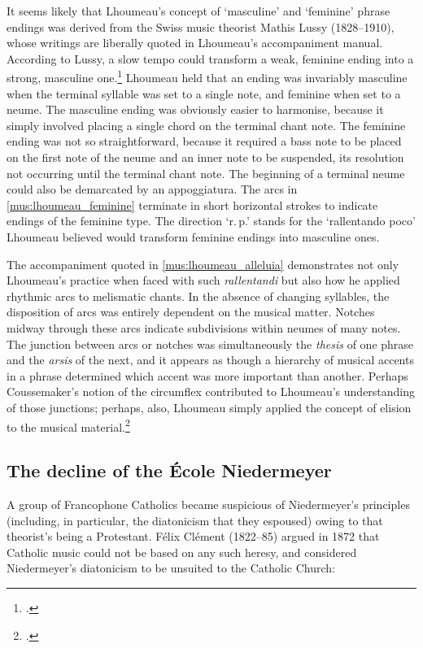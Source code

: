 %
It seems likely that Lhoumeau's concept of `masculine' and `feminine' phrase endings was derived from the Swiss music theorist Mathis Lussy (1828--1910), whose writings are liberally quoted in Lhoumeau's accompaniment manual.
According to Lussy, a slow tempo could transform a weak, feminine ending into a strong, masculine one.\footcite[19--20, 22]{LussyTraiteexpressionmusicale1874}
Lhoumeau held that an ending was invariably masculine when the terminal syllable was set to a single note, and feminine when set to a neume.
The masculine ending was obviously easier to harmonise, because it simply involved placing a single chord on the terminal chant note.
%
The feminine ending was not so straightforward, because it required a bass note to be placed on the first note of the neume and an inner note to be suspended, its resolution not occurring until the terminal chant note.
The beginning of a terminal neume could also be demarcated by an appoggiatura.
The arcs in \cref{mus:lhoumeau_feminine} terminate in short horizontal strokes to indicate endings of the feminine type.
The direction `r.\,p.' stands for the `rallentando poco' Lhoumeau believed would transform feminine endings into masculine ones.
%
\nowidow[2]

The accompaniment quoted in \cref{mus:lhoumeau_alleluia} demonstrates not only Lhoumeau's practice when faced with such \emph{rallentandi} but also how he applied rhythmic arcs to melismatic chants.
In the absence of changing syllables, the disposition of arcs was entirely dependent on the musical matter.
Notches midway through these arcs indicate subdivisions within neumes of many notes.
The junction between arcs or notches was simultaneously the \emph{thesis} of one phrase and the \emph{arsis} of the next, and it appears as though a hierarchy of musical accents in a phrase determined which accent was more important than another.
Perhaps Coussemaker's notion of the circumflex contributed to Lhoumeau's understanding of those junctions; perhaps, also, Lhoumeau simply applied the concept of elision to the musical material.\footcite[33--4, 240--43]{LhoumeauRhythmeexecutionaccompagnement1892}

\subsection{The decline of the École Niedermeyer}
\label{cc:gigout_teppe}%
A group of Francophone Catholics became suspicious of Niedermeyer's principles (including, in particular, the diatonicism that they espoused) owing to that theorist's being a Protestant.
%
Félix Clément (1822--85) argued in 1872 that Catholic music could not be based on any such heresy, and considered Niedermeyer's diatonicism to be unsuited to the Catholic Church:

